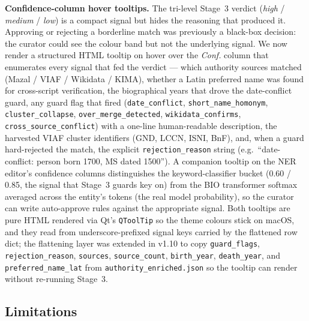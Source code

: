 \documentclass[Afour,sageh,times]{sagej}
\newcommand{\code}[1]{\texttt{#1}}
\begin{document}
\textbf{Confidence-column hover tooltips.} The tri-level Stage~3 verdict (\emph{high} / \emph{medium} / \emph{low}) is a compact signal but hides the reasoning that produced it. Approving or rejecting a borderline match was previously a black-box decision: the curator could see the colour band but not the underlying signal. We now render a structured HTML tooltip on hover over the \emph{Conf.} column that enumerates every signal that fed the verdict --- which authority sources matched (Mazal / VIAF / Wikidata / KIMA), whether a Latin preferred name was found for cross-script verification, the biographical years that drove the date-conflict guard, any guard flag that fired (\texttt{date\_conflict}, \texttt{short\_name\_homonym}, \texttt{cluster\_collapse}, \texttt{over\_merge\_detected}, \texttt{wikidata\_confirms}, \texttt{cross\_source\_conflict}) with a one-line human-readable description, the harvested VIAF cluster identifiers (GND, LCCN, ISNI, BnF), and, when a guard hard-rejected the match, the explicit \texttt{rejection\_reason} string (e.g.\ ``date-conflict: person born 1700, MS dated 1500''). A companion tooltip on the NER editor's confidence columns distinguishes the keyword-classifier bucket (0.60 / 0.85, the signal that Stage~3 guards key on) from the BIO transformer softmax averaged across the entity's tokens (the real model probability), so the curator can write auto-approve rules against the appropriate signal. Both tooltips are pure HTML rendered via Qt's \code{QToolTip} so the theme colours stick on macOS, and they read from underscore-prefixed signal keys carried by the flattened row dict; the flattening layer was extended in v1.10 to copy \texttt{guard\_flags}, \texttt{rejection\_reason}, \texttt{sources}, \texttt{source\_count}, \texttt{birth\_year}, \texttt{death\_year}, and \texttt{preferred\_name\_lat} from \texttt{authority\_enriched.json} so the tooltip can render without re-running Stage~3.

\subsection{Limitations}
\end{document}
